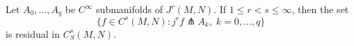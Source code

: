 Let $A_0, \ldots, A_q$ be $C^\infty$ submanifolds of $J^r(M,N)$. If $1 \leqslant r < s \leqslant \infty$, then the set
$$\{ f \in C^s(M,N) : j^r f \pitchfork A_k, \; k = 0, \ldots, q \}$$
is residual in $C^s_S(M,N)$.
